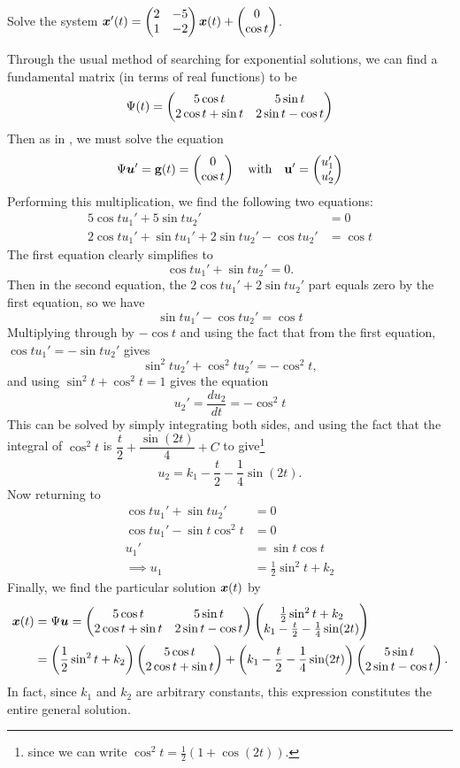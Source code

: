 \begin{eg}\label{eg:varparamsolve}
	Solve the system $\bm{x}'(t) = \begin{pmatrix}2 & -5 \\ 1 & -2\end{pmatrix}\bm{x}(t) + \begin{pmatrix}0\\\cos t\end{pmatrix}$.
	
	Through the usual method of searching for exponential solutions, we can find a fundamental matrix (in terms of real functions) to be
	\[
	\Psi(t) = \begin{pmatrix}5\cos t & 5\sin t \\ 2\cos t + \sin t & 2\sin t - \cos t\end{pmatrix}
	\]
	Then as in , we must solve the equation 
	\[
	\Psi \bm{u}' = \textbf{g}(t) = \begin{pmatrix}0 \\ \cos t\end{pmatrix} \quad \text{with} \quad \textbf{u}' = \begin{pmatrix}u_1' \\ u_2'\end{pmatrix}
	\]
	Performing this multiplication, we find the following two equations:
	\begin{align*}
		5\cos t u_1' + 5\sin t u_2' &= 0 \\ 
		2\cos t u_1' + \sin t u_1' + 2\sin t u_2' - \cos t u_2' &= \cos t
	\end{align*}
	The first equation clearly simplifies to 
	\begin{equation}\label{eq:varparameg2}
		\cos t u_1' + \sin t u_2' = 0.
	\end{equation}
	Then in the second equation, the $2\cos t u_1' + 2\sin t u_2'$ part equals zero by the first equation, so we have
	\[
	\sin t u_1' - \cos t u_2' = \cos t
	\]
	Multiplying through by $-\cos t$ and using the fact that from the first equation, $\cos t u_1' = -\sin t u_2'$ gives
	\[
	\sin^2t u_2' + \cos^2t u_2' = -\cos^2t,
	\]
	and using $\sin^2t + \cos^2t = 1$ gives the equation 
	\[
	u_2' = \frac{du_2}{dt} = -\cos^2t
	\] 
	This can be solved by simply integrating both sides, and using the fact that the integral of $\cos^2t$ is $\dfrac{t}{2} + \dfrac{\sin(2t)}{4} + C$ to give\footnote{since we can write $\cos^2t = \frac12(1 + \cos(2t))$.}
	\[
	u_2 = k_1 - \frac{t}{2} - \frac14\sin(2t).
	\]
	Now returning to 
	\begin{align*}
		\cos t u_1' + \sin t u_2' &= 0 \\
		\cos t u_1' - \sin t \cos^2t &= 0 \\
		u_1' &= \sin t \cos t \\
		\implies u_1 &= \frac12 \sin^2 t + k_2
	\end{align*}
	Finally, we find the particular solution $\bm{x}(t)$ by
	\begin{align*}
		\bm{x}(t) &= \Psi \bm{u} = \begin{pmatrix}5\cos t & 5\sin t \\ 2\cos t + \sin t & 2\sin t - \cos t\end{pmatrix} \begin{pmatrix}\frac12 \sin^2 t + k_2 \\ k_1 - \frac{t}{2} - \frac14\sin(2t)\end{pmatrix} \\
		&= \left(\frac12 \sin^2t + k_2\right)\begin{pmatrix}5\cos t \\ 2\cos t + \sin t\end{pmatrix} + \left(k_1 - \frac{t}{2} - \frac14\sin(2t)\right)\begin{pmatrix}5\sin t \\ 2\sin t - \cos t\end{pmatrix}.
	\end{align*}
	In fact, since $k_1$ and $k_2$ are arbitrary constants, this expression constitutes the entire general solution.
\end{eg}

